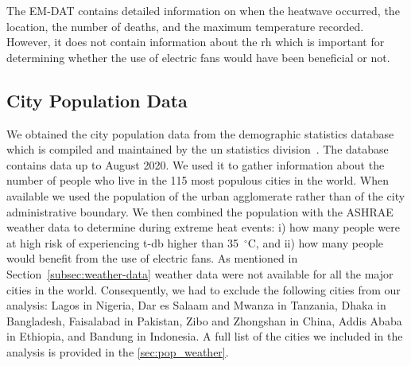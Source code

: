 The EM-DAT contains detailed information on when the heatwave occurred, the location, the number of deaths, and the maximum temperature recorded.
However, it does not contain information about the \ac{rh} which is important for determining whether the use of electric fans would have been beneficial or not.

\subsection{City Population Data}\label{subsec:population-data}

We obtained the city population data from the demographic statistics database which is compiled and maintained by the \ac{un} statistics division~\cite{UNdatare88:online}.
The database contains data up to August 2020.
We used it to gather information about the number of people who live in the 115 most populous cities in the world.
When available we used the population of the urban agglomerate rather than of the city administrative boundary.
We then combined the population with the ASHRAE weather data to determine during extreme heat events: i) how many people were at high risk of experiencing \ac{t-db} higher than 35~$^{\circ}$C\@, and ii) how many people would benefit from the use of electric fans.
As mentioned in Section~\ref{subsec:weather-data} weather data were not available for all the major cities in the world.
Consequently, we had to exclude the following cities from our analysis: Lagos in Nigeria, Dar es Salaam and Mwanza in Tanzania, Dhaka in Bangladesh, Faisalabad in Pakistan, Zibo and Zhongshan in China, Addis Ababa in Ethiopia, and Bandung in Indonesia.
A full list of the cities we included in the analysis is provided in the \ref{sec:pop_weather}.